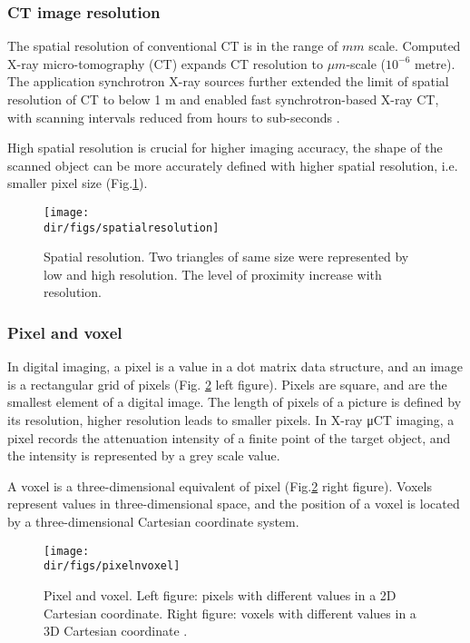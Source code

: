 \subsubsection{CT image resolution}
The spatial resolution of conventional CT is in the range of $mm$ scale. Computed X-ray micro-tomography (\textmu CT) expands CT resolution to $\mu m$-scale ($10^{-6}$ metre). The application synchrotron X-ray sources further extended the limit of spatial resolution of CT to below 1 \textmu m and enabled fast synchrotron-based X-ray \textmu CT, with scanning intervals reduced from hours to sub-seconds \citep{berg2013real}. 

High spatial resolution is crucial for higher imaging accuracy, the shape of the scanned object can be more accurately defined with higher spatial resolution, i.e. smaller pixel size (Fig.\ref{spacialres}).

\begin{figure}
    \centering
    \texttt{[image: \\dir/figs/spatialresolution]}
    \caption{Spatial resolution. Two triangles of same size were represented by low and high resolution. The level of proximity increase with resolution. \citep{CTscanartefacts}}
    \label{spacialres}
\end{figure}

\subsubsection{Pixel and voxel}
In digital imaging, a pixel is a value in a dot matrix data structure, and an image is a rectangular grid of pixels (Fig.
\ref{pnv} left figure). Pixels are square, and are the smallest element of a digital image. The length of pixels of a picture is defined by its resolution, higher resolution leads to smaller pixels. In X-ray μCT imaging, a pixel records the attenuation intensity of a finite point of the target object, and the intensity is represented by a grey scale value.
 
A voxel is a three-dimensional equivalent of pixel (Fig.\ref{pnv} right figure). Voxels represent values in three-dimensional space, and the position of a voxel is located by a three-dimensional Cartesian coordinate system. 

\begin{figure}
    \centering
    \texttt{[image: \\dir/figs/pixelnvoxel]}
    \caption{Pixel and voxel. Left figure: pixels with different values in a 2D Cartesian coordinate. Right figure: voxels with different values in a 3D Cartesian coordinate \citep{CTscanartefacts}.}
    \label{pnv}
\end{figure}

